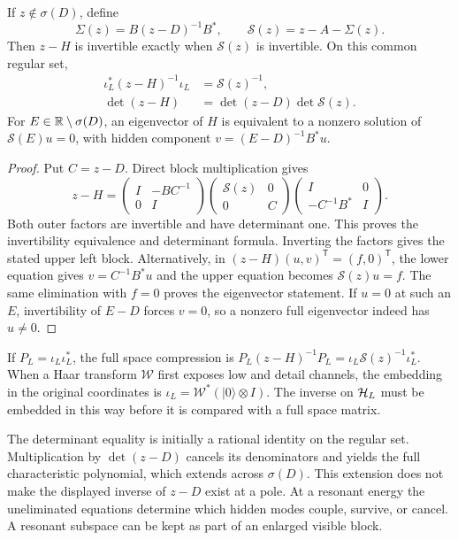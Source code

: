 \begin{theorem}
\label{a-spectral-schur-theorem}
If $z\notin\sigma(D)$, define
\begin{equation}
 \Sigma(z)=B(z-D)^{-1}B^*,\qquad
 \mathcal S(z)=z-A-\Sigma(z).
 \label{a-spectral-schur-definition}
\end{equation}
Then $z-H$ is invertible exactly when $\mathcal S(z)$ is invertible.
On this common regular set,
\begin{align}
 \iota_L^*(z-H)^{-1}\iota_L&=\mathcal S(z)^{-1},\nonumber\\
 \det(z-H)&=\det(z-D)\det\mathcal S(z).
 \label{a-spectral-schur-identities}
\end{align}
For $E\in\mathbb R\setminus\sigma(D)$, an eigenvector of $H$ is equivalent to
a nonzero solution of $\mathcal S(E)u=0$, with hidden component
$v=(E-D)^{-1}B^*u$.
\end{theorem}
\begin{proof}
Put $C=z-D$. Direct block multiplication gives
\[
 z-H=
 \begin{pmatrix}I&-BC^{-1}\\0&I\end{pmatrix}
 \begin{pmatrix}\mathcal S(z)&0\\0&C\end{pmatrix}
 \begin{pmatrix}I&0\\-C^{-1}B^*&I\end{pmatrix}.
\]
Both outer factors are invertible and have determinant one. This proves
the invertibility equivalence and determinant formula. Inverting the
factors gives the stated upper left block. Alternatively, in
$(z-H)(u,v)^{\mathsf T}=(f,0)^{\mathsf T}$, the lower equation gives
$v=C^{-1}B^*u$ and the upper equation becomes $\mathcal S(z)u=f$.
The same elimination with $f=0$ proves the eigenvector statement.
If $u=0$ at such an $E$, invertibility of $E-D$ forces $v=0$, so a
nonzero full eigenvector indeed has $u\ne0$.
\end{proof}

If $P_L=\iota_L\iota_L^*$, the full space compression is
$P_L(z-H)^{-1}P_L=\iota_L\mathcal S(z)^{-1}\iota_L^*$.
When a Haar transform $\mathcal W$ first exposes low and detail channels,
the embedding in the original coordinates is
$\iota_L=\mathcal W^*(|0\rangle\otimes I)$.
The inverse on $\mathcal H_L$ must be embedded in this way before it is compared
with a full space matrix.

The determinant equality is initially a rational identity on the regular
set. Multiplication by $\det(z-D)$ cancels its denominators and yields the
full characteristic polynomial, which extends across $\sigma(D)$.
This extension does not make the displayed inverse of $z-D$ exist at
a pole. At a resonant energy the uneliminated equations determine which
hidden modes couple, survive, or cancel. A resonant subspace can be kept
as part of an enlarged visible block.

